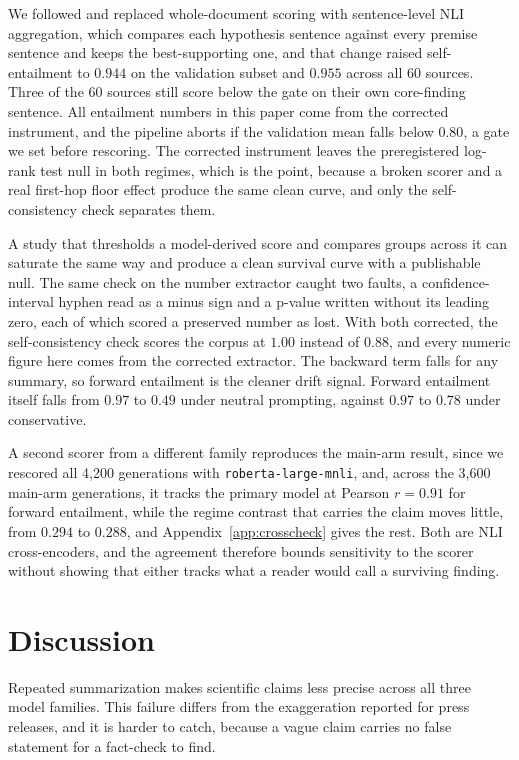 \documentclass{article}
\begin{document}
We followed \citet{laban2022summac} and replaced whole-document scoring with sentence-level NLI aggregation, which compares each hypothesis sentence against every premise sentence and keeps the best-supporting one, and that change raised self-entailment to $0.944$ on the validation subset and $0.955$ across all 60 sources. Three of the 60 sources still score below the gate on their own core-finding sentence. All entailment numbers in this paper come from the corrected instrument, and the pipeline aborts if the validation mean falls below $0.80$, a gate we set before rescoring. The corrected instrument leaves the preregistered log-rank test null in both regimes, which is the point, because a broken scorer and a real first-hop floor effect produce the same clean curve, and only the self-consistency check separates them.

A study that thresholds a model-derived score and compares groups across it can saturate the same way and produce a clean survival curve with a publishable null. The same check on the number extractor caught two faults, a confidence-interval hyphen read as a minus sign and a p-value written without its leading zero, each of which scored a preserved number as lost. With both corrected, the self-consistency check scores the corpus at $1.00$ instead of $0.88$, and every numeric figure here comes from the corrected extractor. The backward term falls for any summary, so forward entailment is the cleaner drift signal. Forward entailment itself falls from $0.97$ to $0.49$ under neutral prompting, against $0.97$ to $0.78$ under conservative.

A second scorer from a different family reproduces the main-arm result, since we rescored all 4{,}200 generations with \texttt{roberta-large-mnli}, and, across the 3{,}600 main-arm generations, it tracks the primary model at Pearson $r = 0.91$ for forward entailment, while the regime contrast that carries the claim moves little, from $0.294$ to $0.288$, and Appendix~\ref{app:crosscheck} gives the rest. Both are NLI cross-encoders, and the agreement therefore bounds sensitivity to the scorer without showing that either tracks what a reader would call a surviving finding.

\section{Discussion}

Repeated summarization makes scientific claims less precise across all three model families. This failure differs from the exaggeration reported for press releases, and it is harder to catch, because a vague claim carries no false statement for a fact-check to find.
\end{document}

